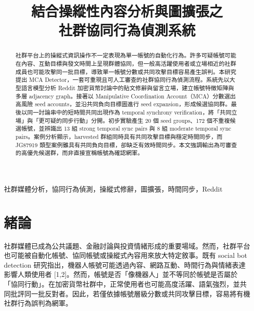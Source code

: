 \documentclass[conference]{IEEEtran}
\begin{document}
\title{結合操縱性內容分析與圖擴張之\\社群協同行為偵測系統}

\author{
}

\maketitle

\begin{abstract}
社群平台上的操縱式資訊操作不一定表現為單一帳號的自動化行為。許多可疑帳號可能在內容、互動目標與發文時間上呈現群體協同，但一般高活躍使用者或立場相近的社群成員也可能攻擊同一批目標，導致單一帳號分數或共同攻擊目標容易產生誤判。本研究提出 MCA Detector，一套可重現且可人工審查的社群協同行為偵測流程。系統先以大型語言模型分析 Reddit 加密貨幣討論中的貼文修辭與留言立場，建立帳號特徵矩陣與多層 adjacency graph。接著以 Manipulative Coordination Account（MCA）分數選出高風險 seed accounts，並沿共同負向目標圖進行 seed expansion，形成候選協同群。最後以同一討論串中的短時間共同出現作為 temporal synchrony verification，將「共同立場」與「更可疑的同步行動」分開。初步實驗產生 20 個 seed groups、172 個不重複候選帳號，並辨識出 13 組 strong temporal sync pairs 與 8 組 moderate temporal sync pairs。案例分析顯示，harvested 群組同時具有共同攻擊目標與穩定時間同步，而 JG87919 類型案例雖具有共同負向目標，卻缺乏有效時間同步。本文強調輸出為可審查的高優先候選群，而非直接宣稱帳號為確認網軍。
\end{abstract}

\begin{IEEEkeywords}
社群媒體分析，協同行為偵測，操縱式修辭，圖擴張，時間同步，Reddit
\end{IEEEkeywords}

\section{緒論}

社群媒體已成為公共議題、金融討論與投資情緒形成的重要場域。然而，社群平台也可能被自動化帳號、協同帳號或操縱式內容用來放大特定敘事。既有 social bot detection 研究指出，機器人帳號可能透過內容、網路互動、時間行為與情緒表達影響人類使用者 [1,2]。然而，帳號是否「像機器人」並不等同於帳號是否屬於「協同行動」。在加密貨幣社群中，正常使用者也可能高度活躍、語氣強烈，並共同批評同一批反對者。因此，若僅依據帳號層級分數或共同攻擊目標，容易將有機社群行為誤判為網軍。
\end{document}
